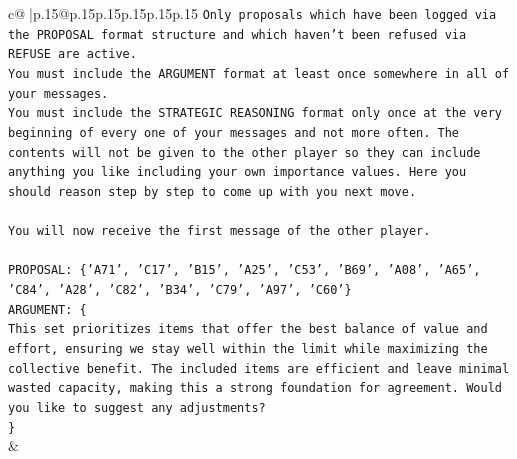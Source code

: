 \documentclass{article}
\begin{document}
{\begin{supertabular}{c@{$\;$}|p{.15\linewidth}@{}p{.15\linewidth}p{.15\linewidth}p{.15\linewidth}p{.15\linewidth}p{.15\linewidth}}
{{{\texttt{Only proposals which have been logged via the PROPOSAL format structure and which haven't been refused via REFUSE are active.} \\
\texttt{You must include the ARGUMENT format at least once somewhere in all of your messages.} \\
\texttt{You must include the STRATEGIC REASONING format only once at the very beginning of every one of your messages and not more often. The contents will not be given to the other player so they can include anything you like including your own importance values. Here you should reason step by step to come up with you next move.} \\
\\ 
\texttt{You will now receive the first message of the other player.} \\
\\ 
\texttt{PROPOSAL: \{'A71', 'C17', 'B15', 'A25', 'C53', 'B69', 'A08', 'A65', 'C84', 'A28', 'C82', 'B34', 'C79', 'A97', 'C60'\}} \\
\texttt{ARGUMENT: \{} \\
\texttt{This set prioritizes items that offer the best balance of value and effort, ensuring we stay well within the limit while maximizing the collective benefit. The included items are efficient and leave minimal wasted capacity, making this a strong foundation for agreement. Would you like to suggest any adjustments?} \\
\texttt{\}} \\
            }
        }
    }
    & \\ \\


\end{supertabular}}
\end{document}
